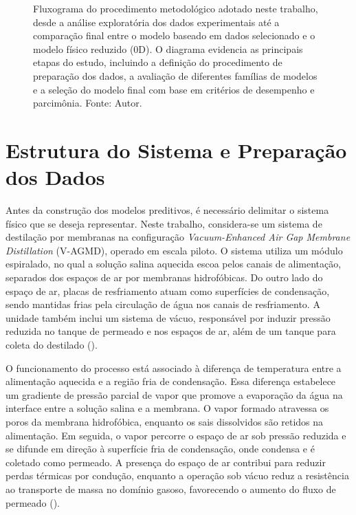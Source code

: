 \begin{figure}[H]
{\begin{tikzpicture}
\end{tikzpicture}
}
\caption[Fluxograma do procedimento metodológico]{Fluxograma do procedimento metodológico adotado neste trabalho, desde a análise exploratória dos dados experimentais até a comparação final entre o modelo baseado em dados selecionado e o modelo físico reduzido (0D). O diagrama evidencia as principais etapas do estudo, incluindo a definição do procedimento de preparação dos dados, a avaliação de diferentes famílias de modelos e a seleção do modelo final com base em critérios de desempenho e parcimônia. Fonte: Autor.}
\label{fig:fluxograma_resultados_pipeline}
\end{figure}

\section{Estrutura do Sistema e Preparação dos Dados}
\label{sec:estrutura_sistema_dados}

Antes da construção dos modelos preditivos, é necessário delimitar o sistema físico que se deseja representar. Neste trabalho, considera-se um sistema de destilação por membranas na configuração \textit{Vacuum-Enhanced Air Gap Membrane Distillation} (V-AGMD), operado em escala piloto. O sistema utiliza um módulo espiralado, no qual a solução salina aquecida escoa pelos canais de alimentação, separados dos espaços de ar por membranas hidrofóbicas. Do outro lado do espaço de ar, placas de resfriamento atuam como superfícies de condensação, sendo mantidas frias pela circulação de água nos canais de resfriamento. A unidade também inclui um sistema de vácuo, responsável por induzir pressão reduzida no tanque de permeado e nos espaços de ar, além de um tanque para coleta do destilado (\cite{Lisboa2024}).

O funcionamento do processo está associado à diferença de temperatura entre a alimentação aquecida e a região fria de condensação. Essa diferença estabelece um gradiente de pressão parcial de vapor que promove a evaporação da água na interface entre a solução salina e a membrana. O vapor formado atravessa os poros da membrana hidrofóbica, enquanto os sais dissolvidos são retidos na alimentação. Em seguida, o vapor percorre o espaço de ar sob pressão reduzida e se difunde em direção à superfície fria de condensação, onde condensa e é coletado como permeado. A presença do espaço de ar contribui para reduzir perdas térmicas por condução, enquanto a operação sob vácuo reduz a resistência ao transporte de massa no domínio gasoso, favorecendo o aumento do fluxo de permeado (\cite{Lisboa2024}).

